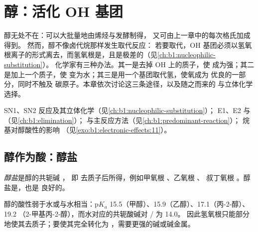 \chapter{醇：活化 OH 基团}\label{ch:b1:alcohol-activation}

醇无处不在：可以大批量地由烯烃与发酵制得，
又可由上一章中的每次格氏加成得到。
然而，醇不像卤代烷那样发生取代反应：
若要取代，OH 基团必须以氢氧根离子的形式离去，而氢氧根是，且是极差的（见\cref{ch:b1:nucleophilic-substitution}）。
化学家有三种办法。其一是去掉 OH 上的质子，使
成为强；其二是加上一个质子，使
变为水；其三是用一个基团取代氢，使氧成为
优良的一部分，同时不触及
碳原子。本章依次讨论这三条途径，以及随之而来的
与立体化学选择。

\begin{recall}
SN1、SN2 反应及其立体化学（见\cref{ch:b1:nucleophilic-substitution}）；
E1、E2 与（见\cref{ch:b1:elimination}）；
与主反应方法（见\cref{ch:b1:predominant-reaction}）；
烷基对醇酸性的影响
（见\cref{exo:b1:electronic-effects:11}）。
\end{recall}

\section{醇作为酸：醇盐}

\begin{definition}[醇盐]\label{def:b1:alcohol-activation:alkoxide}
\emph{醇盐}是醇的共轭碱 ，
即  去质子后所得，例如甲氧根 、乙氧根 、
叔丁氧根 。醇盐是，也是
良好的。
\end{definition}

\begin{proposition}[醇的酸性]\label{prop:b1:alcohol-activation:alcohol-acidity}
醇的酸性弱于水或与水相当：$\mathrm{p}K_a$
15.5（甲醇）、15.9（乙醇）、17.1（丙-2-醇）、19.2
（2-甲基丙-2-醇），而水对应的共轭酸碱对 / 为 14.0。
因此氢氧根只能部分地使其去质子；要使其完全转化为
，需要更强的碱或碱金属。
\end{proposition}

